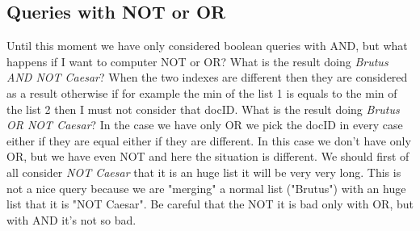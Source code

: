 \subsection{Queries with NOT or OR}
Until this moment we have only considered boolean queries with AND, but what happens if I want to computer NOT or OR? \newline
What is the result doing \textit{Brutus AND NOT Caesar}? When the two indexes are different then they are considered as a result otherwise if for example the min of the list 1 is equals to the min of the list 2 then I must not consider that docID.\newline
What is the result doing \textit{Brutus OR NOT Caesar}? In the case we have only OR we pick the docID in every case either if they are equal either if they are different. In this case we don't have only OR, but we have even NOT and here the situation is different. We should first of all consider \textit{NOT Caesar} that it is an huge list it will be very very long. This is not a nice query because we are "merging" a normal list ("Brutus") with an huge list that it is "NOT Caesar".\newline
Be careful that the NOT it is bad only with OR, but with AND it's not so bad.
